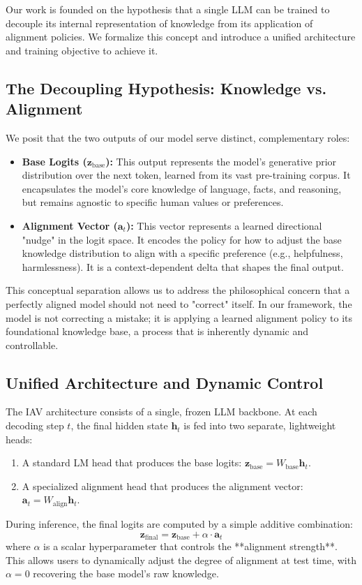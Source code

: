 \documentclass{article}
\begin{document}
Our work is founded on the hypothesis that a single LLM can be trained to decouple its internal representation of knowledge from its application of alignment policies. We formalize this concept and introduce a unified architecture and training objective to achieve it.

\subsection{The Decoupling Hypothesis: Knowledge vs. Alignment}

We posit that the two outputs of our model serve distinct, complementary roles:
\begin{itemize}
    \item \textbf{Base Logits ($\mathbf{z}_{\text{base}}$):} This output represents the model's generative prior distribution over the next token, learned from its vast pre-training corpus. It encapsulates the model's core knowledge of language, facts, and reasoning, but remains agnostic to specific human values or preferences.
    \item \textbf{Alignment Vector ($\mathbf{a}_t$):} This vector represents a learned directional "nudge" in the logit space. It encodes the policy for how to adjust the base knowledge distribution to align with a specific preference (e.g., helpfulness, harmlessness). It is a context-dependent delta that shapes the final output.
\end{itemize}
This conceptual separation allows us to address the philosophical concern that a perfectly aligned model should not need to "correct" itself. In our framework, the model is not correcting a mistake; it is applying a learned alignment policy to its foundational knowledge base, a process that is inherently dynamic and controllable.

\subsection{Unified Architecture and Dynamic Control}

The IAV architecture consists of a single, frozen LLM backbone. At each decoding step $t$, the final hidden state $\mathbf{h}_t$ is fed into two separate, lightweight heads:
\begin{enumerate}
    \item A standard LM head that produces the base logits: $\mathbf{z}_{\text{base}} = W_{\text{base}}\mathbf{h}_t$.
    \item A specialized alignment head that produces the alignment vector: $\mathbf{a}_t = W_{\text{align}}\mathbf{h}_t$.
\end{enumerate}
During inference, the final logits are computed by a simple additive combination:
\begin{equation}
\mathbf{z}_{\text{final}} = \mathbf{z}_{\text{base}} + \alpha \cdot \mathbf{a}_t
\end{equation}
where $\alpha$ is a scalar hyperparameter that controls the **alignment strength**. This allows users to dynamically adjust the degree of alignment at test time, with $\alpha=0$ recovering the base model's raw knowledge.
\end{document}
